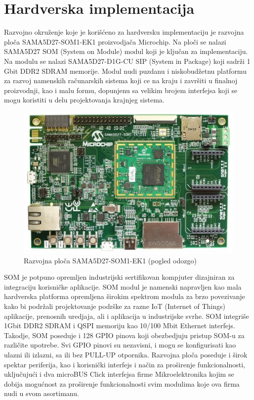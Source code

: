 \documentclass[a4paper,12pt, master]{etf}
\begin{document}
	\newpage

	\chapter{Hardverska implementacija}

	Razvojno okru\v{z}enje koje je kori\v{s}\'{c}eno za hardversku
	implementaciju je razvojna plo\v{c}a SAMA5D27-SOM1-EK1 proizvodja\v{c}a
	Microchip. Na plo\v{c}i se nalazi SAMA5D27 SOM (System on Module) modul
	koji je klju\v{c}an za implementaciju. Na modulu se nalazi SAMA5D27-D1G-CU
	SIP (System in Package) koji sadr\v{z}i 1 Gbit DDR2 SDRAM memorije. Modul
	nudi puzdanu i niskobud\v{z}etnu platformu	za razvoj namenskih
	ra\v{c}unarskih sistema	koji ce na kraju i zavr\v{s}iti u finalnoj
	proizvodnji, kao i malu formu, dopunjenu sa	velikim brojem interfejsa koji
	se mogu koristiti u delu projektovanja krajnjeg sistema.

	\begin{figure}[htb]
			\centering
			\includegraphics[scale=.7]{../pic/hw_top_view.png}
			\caption{Razvojna plo\v{c}a SAMA5D27-SOM1-EK1 (pogled odozgo)}
			\label{fig:hw_top_view}
	\end{figure}

	SOM je potpuno opremljen industrijski sertifikovan kompjuter dizajniran za
	integraciju	korisni\v{c}ke aplikacije. SOM modul je namenski napravljen kao
	mala hardverska platforma opremljena \v{s}irokim spektrom modula za brzo
	povezivanje kako bi podr\v{z}ali projektovanje podr\v{s}ke za razne IoT
	(Internet of Things) aplikacije, prenosnih uredjaja, ali i aplikacija u
	industrijske svrhe. SOM integri\v{s}e 1Gbit DDR2 SDRAM i QSPI memoriju
	kao 10/100 Mbit Ethernet interfejs. Takodje, SOM poseduje i 128 GPIO pinova
	koji obezbedjuju pristup SOM-u za razli\v{c}ite upotrebe. Svi GPIO pinovi
	su nezavisni, i mogu se konfigurisati kao ulazni ili izlazni, sa ili bez
	PULL-UP otpornika. Razvojna plo\v{c}a poseduje i \v{s}irok spektar
	periferija, kao i korisni\v{c}ki interfejs i na\v{c}in za pro\v{s}irenje
	funkcionalnosti, uklju\v{c}uju\'{c}i i dva microBUS Click interfejsa firme
	Mikroelektronika kojim se dobija mogu\'{c}nost za pro\v{s}irenje
	funkcionalnosti svim modulima koje ova firma nudi u svom asortimanu.
\end{document}
